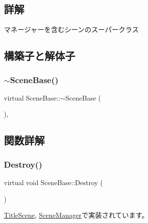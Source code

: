 \subsection{詳解}
マネージャーを含むシーンのスーパークラス 

\subsection{構築子と解体子}
\mbox{\label{class_scene_base_a187dd160e5a16909bcc6529851e38318}} 
\subsubsection{\texorpdfstring{$\sim$\+Scene\+Base()}{~SceneBase()}}
{\footnotesize\ttfamily virtual Scene\+Base\+::$\sim$\+Scene\+Base (\begin{DoxyParamCaption}{ }\end{DoxyParamCaption})\hspace{0.3cm}{\ttfamily [inline]}, {\ttfamily [virtual]}}



\subsection{関数詳解}
\mbox{\label{class_scene_base_a7c5b54020bc519b4dadfe9770d6b27f7}} 
\subsubsection{\texorpdfstring{Destroy()}{Destroy()}}
{\footnotesize\ttfamily virtual void Scene\+Base\+::\+Destroy (\begin{DoxyParamCaption}{ }\end{DoxyParamCaption})\hspace{0.3cm}{\ttfamily [pure virtual]}}



\mbox{\hyperlink{class_title_scene_adfbc5f934572ede2e36419b089c88fe8}{Title\+Scene}}, \mbox{\hyperlink{class_scene_manager_a0e3ad11342e763f0d4108c0b4674a157}{Scene\+Manager}}で実装されています。

\mbox{\label{class_scene_base_a24d7db43c819924dc8b07b436f6d3148}} 

